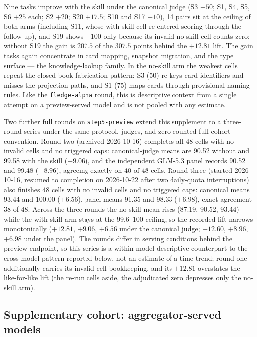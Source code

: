 \documentclass[11pt]{article}
\begin{document}
Nine tasks improve with the skill under the canonical judge (S3 $+50$; S1, S4, S5, S6 $+25$ each; S2 $+20$; S20 $+17.5$; S10 and S17 $+10$), 14 pairs sit at the ceiling of both arms (including S11, whose with-skill cell re-entered scoring through the follow-up), and S19 shows $+100$ only because its invalid no-skill cell counts zero; without S19 the gain is $207.5$ of the $307.5$ points behind the $+12.81$ lift. The gain tasks again concentrate in card mapping, snapshot migration, and the type surface --- the knowledge-lookup family. In the no-skill arm the weakest cells repeat the closed-book fabrication pattern: S3 (50) re-keys card identifiers and misses the projection paths, and S1 (75) maps cards through provisional naming rules. Like the \texttt{fledge-alpha} round, this is descriptive context from a single attempt on a preview-served model and is not pooled with any estimate.

Two further full rounds on \texttt{step5-preview} extend this supplement to a three-round series under the same protocol, judges, and zero-counted full-cohort convention. Round two (archived 2026-10-16) completes all 48 cells with no invalid cells and no triggered caps: canonical-judge means are 90.52 without and 99.58 with the skill ($+9.06$), and the independent GLM-5.3 panel records 90.52 and 99.48 ($+8.96$), agreeing exactly on 40 of 48 cells. Round three (started 2026-10-16, resumed to completion on 2026-10-22 after two daily-quota interruptions) also finishes 48 cells with no invalid cells and no triggered caps: canonical means 93.44 and 100.00 ($+6.56$), panel means 91.35 and 98.33 ($+6.98$), exact agreement 38 of 48. Across the three rounds the no-skill mean rises (87.19, 90.52, 93.44) while the with-skill arm stays at the 99.6--100 ceiling, so the recorded lift narrows monotonically ($+12.81$, $+9.06$, $+6.56$ under the canonical judge; $+12.60$, $+8.96$, $+6.98$ under the panel). The rounds differ in serving conditions behind the preview endpoint, so this series is a within-model descriptive counterpart to the cross-model pattern reported below, not an estimate of a time trend; round one additionally carries its invalid-cell bookkeeping, and its $+12.81$ overstates the like-for-like lift (the re-run cells aside, the adjudicated zero depresses only the no-skill arm).

\subsection{Supplementary cohort: aggregator-served models}\label{app:newmodels}
\end{document}
